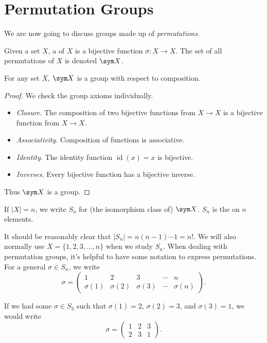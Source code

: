 \documentclass[a4]{scrreprt}
\begin{document}
\section{Permutation Groups}

We are now going to discuss groups made up of \emph{permutations}.

\begin{definition}[Permutations]
	Given a set $X$, a  of $X$ is a bijective function $\sigma: X \rightarrow X$. The set of all permutations of $X$ is denoted $\sym X$.
\end{definition}

\begin{theorem}
	For any set $X$, $\sym X$ is a group with respect to composition. 
\end{theorem}
\begin{proof}
	We check the group axioms individually.
	\begin{itemize}
		\item \emph{Closure}. The composition of two bijective functions from $X \rightarrow X$ is a bijective function from $X \rightarrow X$.
		\item \emph{Associativity}. Composition of functions is associative.
		\item \emph{Identity}. The identity function $\operatorname{id}(x) = x$ is bijective.
		\item \emph{Inverses}. Every bijective function has a bijective inverse.
	\end{itemize}
	Thus $\sym X$ is a group.
\end{proof}

\begin{definition}
	If $|X| = n$, we write $S_n$ for (the isomorphism class of) $\sym X$. $S_n$ is the  on $n$ elements.
\end{definition}

It should be reasonably clear that $|S_n| = n(n - 1) \cdots 1 = n!$. We will also normally use $X = \{1, 2, 3, \dots, n \}$ when we study $S_n$. When dealing with permutation groups, it's helpful to have some notation to express permutations. For a general $\sigma \in S_n$, we write
$$
\sigma = \begin{pmatrix}
	1 & 2 & 3 & \cdots & n \\
	\sigma(1) & \sigma(2) & \sigma(3) & \cdots & \sigma(n)
\end{pmatrix}.
$$

\begin{example}
	If we had some $\sigma \in S_3$ such that $\sigma(1) = 2$, $\sigma(2) = 3$, and $\sigma(3) = 1$, we would write
	$$
\sigma = \begin{pmatrix}
	1 & 2 & 3 \\
	2 & 3 & 1
\end{pmatrix}.
$$
\end{example}
\end{document}

